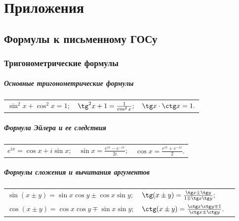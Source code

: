 \renewcommand*{\arraystretch}{1.5}
\everymath{\displaystyle}

\part{Приложения}
\chapter[Формулы к письменному ГОСу]{Формулы к письменному ГОСу\footnotemark}

\section{Тригонометрические формулы}

\subsubsection{Основные тригонометрические формулы}
\begin{longtable}[l]{l l l}
$\sin^2x+\cos^2x=1;$
&
$\tg^2x+1=\frac{1}{\cos^2x};$
&
$\tg x\cdot\ctg x=1.$
\end{longtable}

\subsubsection{Формула Эйлера и ее следствия}
\begin{longtable}[l]{ l l l}
$e^{ix} = \cos x + i \sin x;$
&
$\sin x = \frac{e^{ix}-e^{-ix}}{2i};$
&
$\cos x = \frac{e^{ix}+e^{-ix}}{2}.$
\end{longtable}

\subsubsection{Формулы сложения и вычитания аргументов}
\begin{longtable}[l]{l l l}
$\sin(x\pm y)=\sin x \cos y \pm \cos x \sin y;$
&
$\tg(x\pm y)=\frac{\tg x \pm \tg y}{1 \mp \tg x\tg y};$
\\
$\cos(x\pm y)= \cos x \cos y \mp \sin x \sin y;$
&
$\ctg(x\pm y)=\frac{\ctg x\ctg y \mp 1}{\ctg x \pm \ctg y}.$
\end{longtable}


